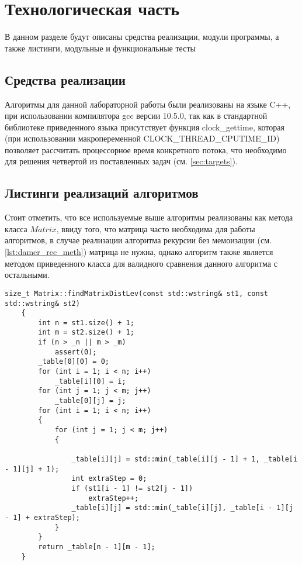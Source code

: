 \chapter{Технологическая часть}
В данном разделе будут описаны средства реализации, модули программы, а также листинги, модульные и функциональные тесты
\section{Средства реализации}
Алгоритмы для данной лабораторной работы были реализованы на языке C++, при использовании компилятора gcc версии 10.5.0, так как в стандартной библиотеке приведенного языка
присутствует функция clock\_gettime, которая (при использовании макропеременной CLOCK\_THREAD\_CPUTIME\_ID) позволяет рассчитать процессорное время конкретного потока, 
что необходимо для решения четвертой из  поставленных задач (см. \ref{sec:targets}).\cite{cpp-time}



\section{Листинги реализаций алгоритмов}

Стоит отметить, что все используемые выше алгоритмы реализованы как метода класса $Matrix$, ввиду того, что матрица
часто необходима для работы алгоритмов, в случае реализации алгоритма рекурсии без мемоизации (см. \ref{lst:damer_rec_meth}) матрица не нужна, однако 
алгоритм также является методом приведенного класса для валидного сравнения данного алгоритма с остальными.

\begin{lstlisting}[label=lst:lev_matr,caption=Метод нахождения расстояния Левенштейна с использованием матрицы]
    size_t Matrix::findMatrixDistLev(const std::wstring& st1, const std::wstring& st2)
    {
        int n = st1.size() + 1;
        int m = st2.size() + 1;
        if (n > _n || m > _m)
            assert(0);
        _table[0][0] = 0;
        for (int i = 1; i < n; i++)
            _table[i][0] = i;
        for (int j = 1; j < m; j++)
            _table[0][j] = j;
        for (int i = 1; i < n; i++)
        {
            for (int j = 1; j < m; j++)
            {
    
                _table[i][j] = std::min(_table[i][j - 1] + 1, _table[i - 1][j] + 1);
                int extraStep = 0;
                if (st1[i - 1] != st2[j - 1])
                    extraStep++;
                _table[i][j] = std::min(_table[i][j], _table[i - 1][j - 1] + extraStep);
            }
        }
        return _table[n - 1][m - 1];
    }
\end{lstlisting}


